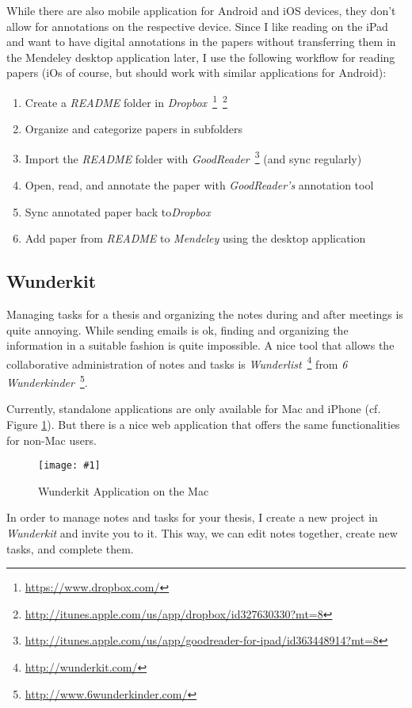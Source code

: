 \documentclass{article}
\newcommand{\img}[4]{
	\begin{figure}[!htb]
		\centering
		\texttt{[image: \#1]}
		\caption{#3}
		\label{#2}
	\end{figure}
}
\begin{document}
While there are also mobile application for Android and iOS devices, they don't allow for annotations on the respective device.
Since I like reading on the iPad and want to have digital annotations in the papers without transferring them in the Mendeley desktop application later, I use the following workflow for reading papers (iOs of course, but should work with similar applications for Android):

\begin{enumerate}
	\item Create a \emph{README} folder in \emph{Dropbox}~\footnote{\url{https://www.dropbox.com/}}~\footnote{\url{http://itunes.apple.com/us/app/dropbox/id327630330?mt=8}}
	\item Organize and categorize papers in subfolders
	\item Import the \emph{README} folder with \emph{GoodReader}~\footnote{\url{http://itunes.apple.com/us/app/goodreader-for-ipad/id363448914?mt=8}} (and sync regularly)
	\item Open, read, and annotate the paper with \emph{GoodReader's} annotation tool
	\item Sync annotated paper back to\emph{Dropbox}
	\item Add paper from \emph{README} to \emph{Mendeley} using the desktop application
\end{enumerate}




\subsection{Wunderkit}

Managing tasks for a thesis and organizing the notes during and after meetings is quite annoying.
While sending emails is ok, finding and organizing the information in a suitable fashion is quite impossible.
A nice tool that allows the collaborative administration of notes and tasks is \emph{Wunderlist}~\footnote{\url{http://wunderkit.com/}} from \emph{6 Wunderkinder}~\footnote{\url{http://www.6wunderkinder.com/}}.

Currently, standalone applications are only available for Mac and iPhone (cf. Figure \ref{fig:wunderkit}).
But there is a nice web application that offers the same functionalities for non-Mac users.

\img{wunderkit}{fig:wunderkit}{Wunderkit Application on the Mac}{0.6}

In order to manage notes and tasks for your thesis, I create a new project in \emph{Wunderkit} and invite you to it.
This way, we can edit notes together, create new tasks, and complete them.
\end{document}
